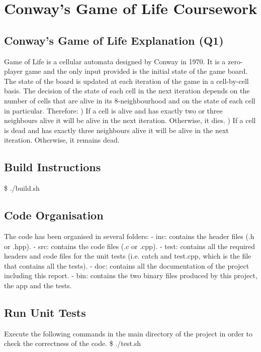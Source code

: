 \documentclass[a4paper,12pt,twoside]{report}
\author{Luis Carlos Garcia-Peraza Herrera}
\date{\today}
\begin{document}
\chapter*{Conway's Game of Life Coursework}
\section*{Conway's Game of Life Explanation (Q1)}
	
Game of Life is a cellular automata designed by Conway in 1970. It is a zero-player game and the only input provided is the initial state of the game board.
The state of the board is updated at each iteration of the game in a cell-by-cell basis. The decision of the state of each cell in the next iteration depends
on the number of cells that are alive in its 8-neighbourhood and on the state of each cell in particular. Therefore:
\newline{}) If a cell is alive and has exactly two or three neighbours alive it will be alive in the next iteration. Otherwise, it dies.
\newline{}) If a cell is dead and has exactly three neighbours alive it will be alive in the next iteration. Otherwise, it remains dead.

\section*{Build Instructions}
\$ ./build.sh
\section*{Code Organisation}
The code has been organised in several folders: \newline
- inc: contains the header files (.h or .hpp). \newline
- src: contains the code files (.c or .cpp). \newline
- test: contains all the required headers and code files for the unit tests (i.e. catch and test.cpp, which is the file that contains all the tests). \newline
- doc: contains all the documentation of the project including this report. \newline
- bin: contains the two binary files produced by this project, the app and the tests.
\section*{Run Unit Tests}
Execute the following commands in the main directory of the project in order to check the correctness of the code. \newline
\newline
\$ ./test.sh
\end{document}

